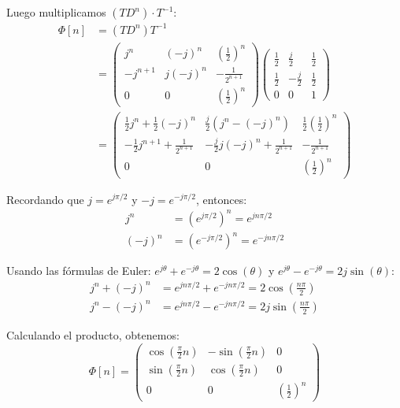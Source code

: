\documentclass[
  11pt,
  letterpaper,
   addpoints,
   answers
  ]{exam}
\begin{document}
\begin{questions}
\begin{solution}
Luego multiplicamos $(T D^n) \cdot T^{-1}$:
\begin{align}
  \Phi[n] &= (T D^n) T^{-1} \\
  &= \begin{pmatrix} j^n & (-j)^n & \left(\frac{1}{2}\right)^n \\ -j^{n+1} & j(-j)^n & -\frac{1}{2^{n+1}} \\ 0 & 0 & \left(\frac{1}{2}\right)^n \end{pmatrix} \begin{pmatrix} \frac{1}{2} & \frac{j}{2} & \frac{1}{2} \\ \frac{1}{2} & -\frac{j}{2} & \frac{1}{2} \\ 0 & 0 & 1 \end{pmatrix}\\
  &= \begin{pmatrix} \frac{1}{2}j^n + \frac{1}{2}(-j)^n & \frac{j}{2}(j^n - (-j)^n) & \frac{1}{2}\left(\frac{1}{2}\right)^n \\ -\frac{1}{2}j^{n+1} + \frac{1}{2^{n+1}} & -\frac{j}{2}j(-j)^n + \frac{1}{2^{n+1}} & -\frac{1}{2^{n+1}} \\ 0 & 0 & \left(\frac{1}{2}\right)^n \end{pmatrix}
\end{align}

Recordando que $j = e^{j\pi/2}$ y $-j = e^{-j\pi/2}$, entonces:
\begin{align}
j^n &= (e^{j\pi/2})^n = e^{jn\pi/2} \\
(-j)^n &= (e^{-j\pi/2})^n = e^{-jn\pi/2}
\end{align}

Usando las fórmulas de Euler: $e^{j\theta} + e^{-j\theta} = 2\cos(\theta)$ y $e^{j\theta} - e^{-j\theta} = 2j\sin(\theta)$:
\begin{align}
j^n + (-j)^n &= e^{jn\pi/2} + e^{-jn\pi/2} = 2\cos\left(\frac{n\pi}{2}\right) \\
j^n - (-j)^n &= e^{jn\pi/2} - e^{-jn\pi/2} = 2j\sin\left(\frac{n\pi}{2}\right)
\end{align}

Calculando el producto, obtenemos:
\begin{equation}
  \Phi[n] = \begin{pmatrix} \cos\left(\frac{\pi}{2} n\right) & -\sin\left(\frac{\pi}{2} n\right) & 0 \\ \sin\left(\frac{\pi}{2} n\right) & \cos\left(\frac{\pi}{2} n\right) & 0 \\ 0 & 0 & \left(\frac{1}{2}\right)^n \end{pmatrix}
\end{equation}


\end{solution}
\end{questions}
\end{document}
